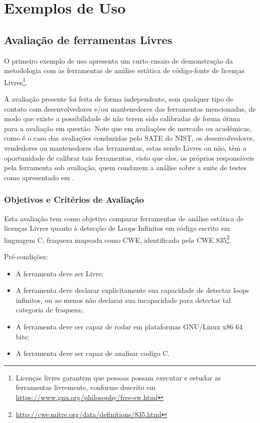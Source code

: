 \chapter{Exemplos de Uso}\label{exemplos_de_uso}

\section{Avaliação de ferramentas Livres}

O primeiro exemplo de uso apresenta um curto ensaio de demonstração da metodologia com as ferramentas de análise estática de código-fonte de licenças Livres\footnote{Licenças livres garantem que pessoas possam executar e estudar as ferramentas livremente, conforme descrito em \url{https://www.gnu.org/philosophy/free-sw.html}}. 

A avaliação presente foi feita de forma independente, sem qualquer tipo de contato com desenvolvedores e/ou mantenedores das ferramentas mencionadas, de modo que existe a possibilidade de não terem sido calibradas de forma ótima para a avaliação em questão. Note que em avaliações de mercado ou acadêmicas, como é o caso das avaliações conduzidas pelo SATE do NIST, os desenvolvedores, vendedores ou mantenedores das ferramentas, estas sendo Livres ou não, têm a oportunidade de calibrar tais ferramentas, visto que eles, os próprios responsáveis pela ferramenta sob avaliação, quem conduzem a análise sobre a suite de testes como apresentado em \cite{sate_iv}.

\subsection{Objetivos e Critérios de Avaliação}

Esta avaliação tem como objetivo comparar ferramentas de análise estática de licenças Livres quanto à detecção de Loops Infinitos em código escrito em linguagem C, fraqueza mapeada como CWE, identificada pela CWE 835\footnote{\url{http://cwe.mitre.org/data/definitions/835.html}}.

Pré-condições:
\begin{itemize}
  \item A ferramenta deve ser Livre;
  \item A ferramenta deve declarar explicitamente sua capacidade de detectar loops infinitos, ou ao menos não declarar sua incapacidade para detectar tal categoria de fraqueza;
  \item A ferramenta deve ser capaz de rodar em plataformas GNU/Linux x86 64 bits;
  \item A ferramenta deve ser capaz de analisar codigo C.
\end{itemize}


